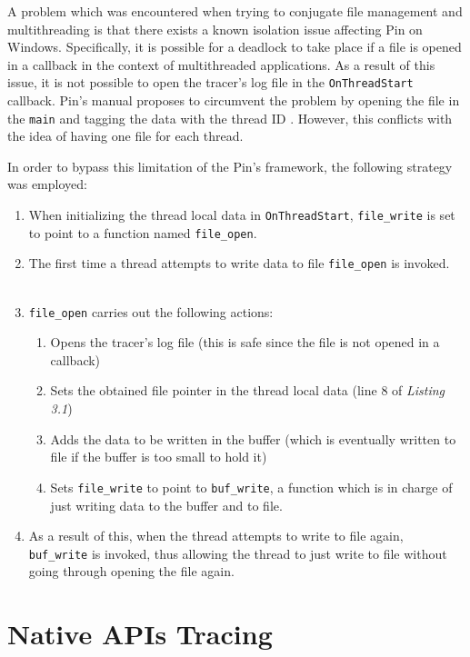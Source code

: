 \documentclass[binding=0.6cm,LaM,english,noexaminfo,oneside]{sapthesis} %
\begin{document}
A problem which was encountered when trying to conjugate file management and multithreading is that there exists a known isolation issue affecting Pin on Windows. Specifically, it is possible for a deadlock to take place if a file is opened in a callback in the context of multithreaded applications. As a result of this issue, it is not possible to open the tracer's log file in the \texttt{OnThreadStart} callback. Pin's manual proposes to circumvent the problem by opening the file in the \texttt{main} and tagging the data with the thread ID \cite{Pin}. However, this conflicts with the idea of having one file for each thread.

In order to bypass this limitation of the Pin's framework, the following strategy was employed:
\begin{enumerate}
\item When initializing the thread local data in \texttt{OnThreadStart}, \texttt{file\_write} is set to point to a function named \texttt{file\_open}.
\item The first time a thread attempts to write data to file \texttt{file\_open} is invoked.
\\
\\
\item \texttt{file\_open} carries out the following actions:
\begin{enumerate}
\item Opens the tracer's log file (this is safe since the file is not opened in a callback)
\item Sets the obtained file pointer in the thread local data (line 8 of \textit{Listing 3.1})
\item Adds the data to be written in the buffer (which is eventually written to file if the buffer is too small to hold it)
\item Sets \texttt{file\_write} to point to \texttt{buf\_write}, a function which is in charge of just writing data to the buffer and to file.
\end{enumerate}
\item As a result of this, when the thread attempts to write to file again, \texttt{buf\_write} is invoked, thus allowing the thread to just write to file without going through opening the file again.   
\end{enumerate}   

\section{Native APIs Tracing}

\end{document}
